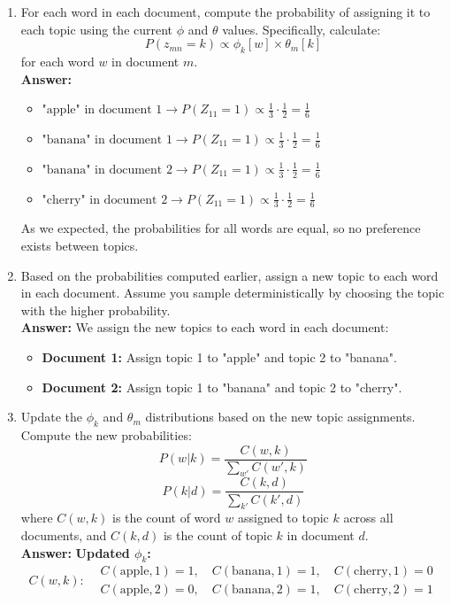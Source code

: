 \documentclass{article}
\begin{document}
\begin{enumerate}
 \item For each word in each document, compute the probability of assigning it to each topic using the current $\phi$ and $\theta$ values. Specifically, calculate:
\[
P(z_{mn} = k) \propto \phi_k[w] \times \theta_m[k]
\]
for each word $w$ in document $m$.\\
\textbf{Answer:}
	\begin{itemize}
	\item $ \text{"apple" in document 1} \rightarrow P(Z_{11} = 1) \propto \frac{1}{3} \cdot \frac{1}{2} = \frac{1}{6}$
	\item $ \text{"banana" in document 1} \rightarrow P(Z_{11} = 1) \propto \frac{1}{3} \cdot \frac{1}{2} = \frac{1}{6}$
	\item $ \text{"banana" in document 2} \rightarrow P(Z_{11} = 1) \propto \frac{1}{3} \cdot \frac{1}{2} = \frac{1}{6}$
	\item $ \text{"cherry" in document 2} \rightarrow P(Z_{11} = 1) \propto \frac{1}{3} \cdot \frac{1}{2} = \frac{1}{6}$
	\end{itemize}
	\text As we expected, the probabilities for all words are equal, so no preference exists between topics.

 \item Based on the probabilities computed earlier, assign a new topic to each word in each document. Assume you sample deterministically by choosing the topic with the higher probability.\\
\textbf{Answer:}
	We assign the new topics to each word in each document:
	\begin{itemize}
	    \item \textbf{Document 1:} Assign topic 1 to "apple" and topic 2 to "banana".
	    \item \textbf{Document 2:} Assign topic 1 to "banana" and topic 2 to "cherry".
	\end{itemize}


  \item Update the $\phi_k$ and $\theta_m$ distributions based on the new topic assignments. Compute the new probabilities:
\[
P(w|k) = \frac{C(w, k)}{\sum_{w'} C(w', k)}
\]
\[
P(k|d) = \frac{C(k, d)}{\sum_{k'} C(k', d)}
\]
where $C(w, k)$ is the count of word $w$ assigned to topic $k$ across all documents, and $C(k, d)$ is the count of topic $k$ in document $d$.\\

\textbf{Answer:}
	\textbf{Updated \( \phi_k \):}
	\[
	C(w, k):
	\begin{aligned}
	    &C(\text{apple}, 1) = 1, \quad C(\text{banana}, 1) = 1, \quad C(\text{cherry}, 1) = 0 \\
	    &C(\text{apple}, 2) = 0, \quad C(\text{banana}, 2) = 1, \quad C(\text{cherry}, 2) = 1
	\end{aligned}
	\]
	

\end{enumerate}
\end{document}

